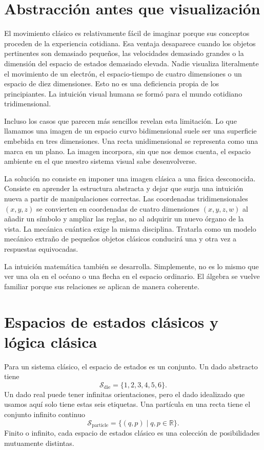 \section{Abstracción antes que visualización}

El movimiento clásico es relativamente fácil de imaginar porque sus conceptos proceden de la experiencia cotidiana. Esa ventaja desaparece cuando los objetos pertinentes son demasiado pequeños, las velocidades demasiado grandes o la dimensión del espacio de estados demasiado elevada. Nadie visualiza literalmente el movimiento de un electrón, el espacio-tiempo de cuatro dimensiones o un espacio de diez dimensiones. Esto no es una deficiencia propia de los principiantes. La intuición visual humana se formó para el mundo cotidiano tridimensional.

Incluso los casos que parecen más sencillos revelan esta limitación. Lo que llamamos una imagen de un espacio curvo bidimensional suele ser una superficie embebida en tres dimensiones. Una recta unidimensional se representa como una marca en un plano. La imagen incorpora, sin que nos demos cuenta, el espacio ambiente en el que nuestro sistema visual sabe desenvolverse.

La solución no consiste en imponer una imagen clásica a una física desconocida. Consiste en aprender la estructura abstracta y dejar que surja una intuición nueva a partir de manipulaciones correctas. Las coordenadas tridimensionales \((x,y,z)\) se convierten en coordenadas de cuatro dimensiones \((x,y,z,w)\) al añadir un símbolo y ampliar las reglas, no al adquirir un nuevo órgano de la vista. La mecánica cuántica exige la misma disciplina. Tratarla como un modelo mecánico extraño de pequeños objetos clásicos conducirá una y otra vez a respuestas equivocadas.

\begin{remark}
La intuición matemática también se desarrolla. Simplemente, no es lo mismo que ver una ola en el océano o una flecha en el espacio ordinario. El álgebra se vuelve familiar porque sus relaciones se aplican de manera coherente.
\end{remark}

\section{Espacios de estados clásicos y lógica clásica}

Para un sistema clásico, el espacio de estados es un conjunto. Un dado abstracto tiene
\begin{equation}
  \mathcal S_{\mathrm{die}}=\{1,2,3,4,5,6\}.
\end{equation}
Un dado real puede tener infinitas orientaciones, pero el dado idealizado que usamos aquí solo tiene estas seis etiquetas. Una partícula en una recta tiene el conjunto infinito continuo
\begin{equation}
  \mathcal S_{\mathrm{particle}}
  =
  \{(q,p)\mid q,p\in\mathbb R\}.
\end{equation}
Finito o infinito, cada espacio de estados clásico es una colección de posibilidades mutuamente distintas.

